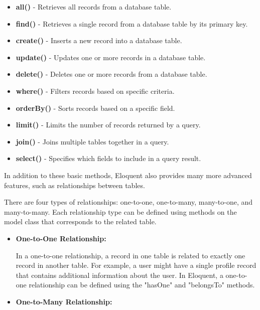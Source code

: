 \begin{itemize}
\begin{itemize}
    \item \textbf{all()} - Retrieves all records from a database table.
    
    \item \textbf{find()} - Retrieves a single record from a database table by its primary key.
    
    \item \textbf{create()} - Inserts a new record into a database table.

    \item \textbf{update()} - Updates one or more records in a database table.

    \item \textbf{delete()} - Deletes one or more records from a database table.

    \item \textbf{where()} - Filters records based on specific criteria.

    \item \textbf{orderBy()} - Sorts records based on a specific field.

    \item \textbf{limit()} - Limits the number of records returned by a query.

    \item \textbf{join()} - Joins multiple tables together in a query.

    \item \textbf{select()} - Specifies which fields to include in a query result.
\end{itemize}
In addition to these basic methods, Eloquent also provides many more advanced features, such as relationships between tables. 

There are four types of relationships: one-to-one, one-to-many, many-to-one, and many-to-many. Each relationship type can be defined using methods on the model class that corresponds to the related table.
\begin{itemize}
    \item \textbf{One-to-One Relationship:}
    
    In a one-to-one relationship, a record in one table is related to exactly one record in another table. For example, a user might have a single profile record that contains additional information about the user. In Eloquent, a one-to-one relationship can be defined using the "hasOne" and "belongsTo" methods.
    \item \textbf{One-to-Many Relationship:}
    

\end{itemize}
\end{itemize}
